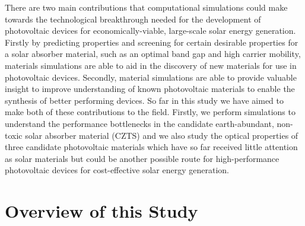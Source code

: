 There are two main contributions that computational simulations could make towards the technological breakthrough needed for the development of photovoltaic devices for economically-viable, large-scale solar energy generation. Firstly by predicting properties and screening for certain desirable properties for a solar absorber material, such as an optimal band gap and high carrier mobility, materials simulations are able to aid in the discovery of new materials for use in photovoltaic devices. Secondly, material simulations are able to provide valuable insight to improve understanding of known photovoltaic materials to enable the synthesis of better performing devices. So far in this study we have aimed to make both of these contributions to the field. Firstly, we perform simulations to understand the performance bottlenecks in the candidate earth-abundant, non-toxic solar absorber material \CZTS (CZTS) and we also study the optical properties of three candidate photovoltaic materials which have so far received little attention as solar materials but could be another possible route for high-performance photovoltaic devices for cost-effective solar energy generation.



\section{Overview of this Study}

